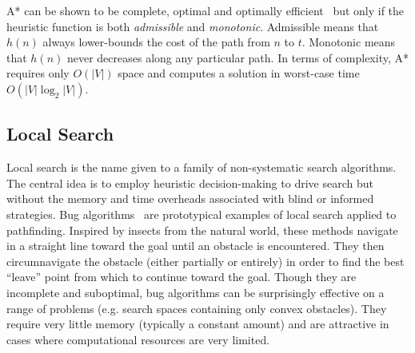A* can be shown to be complete, optimal and optimally
efficient~\citep{dechter85} but only if the heuristic function is both
\emph{admissible} and \emph{monotonic}. Admissible means that $h(n)$ always
lower-bounds the cost of the path from $n$ to $t$. Monotonic means that $h(n)$
never decreases along any particular path.
In terms of complexity, A* requires only $O(|V|)$ space and computes a solution in 
worst-case time $O(|V|\log_2{|V|})$.

\subsection{Local Search}
\label{cha::lit::search::local}
Local search is the name given to a family of non-systematic search algorithms.
The central idea is to employ heuristic decision-making to drive search but 
without the memory and time overheads associated with blind or informed strategies.
Bug algorithms~\citep{choset05} are prototypical examples of local search
applied to pathfinding.
Inspired by insects from the natural world, these methods navigate in a straight 
line toward the goal until an obstacle is encountered. They then circumnavigate 
the obstacle (either partially or entirely) in order to find the best ``leave'' 
point from which to continue toward the goal.
Though they are incomplete and suboptimal, bug algorithms can be surprisingly
effective on a range of problems (e.g. search spaces containing only convex
obstacles). They require very little memory (typically a constant amount) and
are attractive in cases where computational resources are very limited.

